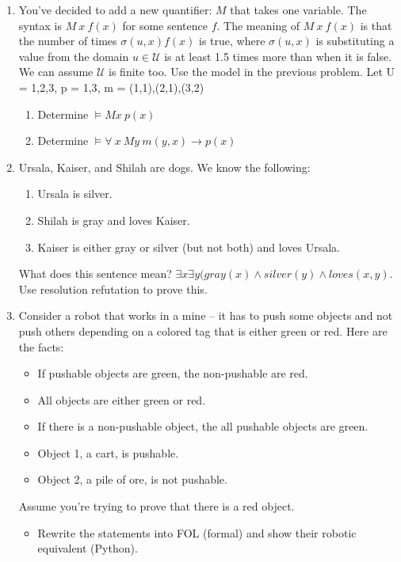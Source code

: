 \documentclass{article}
\begin{document}
\begin{enumerate}
\begin{enumerate}
\end{enumerate}
\item You've decided to add a new quantifier: $M$ that takes one variable.  The syntax is $M\ x\ f(x)$ for some sentence $f$.  The meaning of $M\ x\ f(x)$ is that the number of times $\sigma(u,x) f(x)$ is true, where $\sigma(u,x)$ is substituting a value from the domain $u \in \mathcal{U}$ is at least 1.5 times more than when it is false.  We can assume $\mathcal{U}$ is finite too.  Use the model in the previous problem.
\newline Let U = {1,2,3}, p = {1,3}, m = {(1,1),(2,1),(3,2)}
\begin{enumerate}
\item Determine $\models M x\ p(x)$
\item Determine $\models \forall \ x\ M y \ m(y,x) \rightarrow p(x)$
\end{enumerate}
\item Ursala, Kaiser, and Shilah are dogs.  We know the following:
\begin{enumerate}
\item Ursala is silver.
\item Shilah is gray and loves Kaiser.
\item Kaiser is either gray or silver (but not both) and loves Ursala.
\end{enumerate}
What does this sentence mean? $\exists x \exists y (gray(x) \wedge silver(y) \wedge loves(x,y)$.  Use resolution refutation to prove this.
\item Consider a robot that works in a mine -- it has to push some objects and not push others depending on a colored tag that is either green or red.  Here are the facts:
\begin{itemize}
\item If pushable objects are green, the non-pushable are red.
\item All objects are either green or red.
\item If there is a non-pushable object, the all pushable objects are green.
\item Object 1, a cart, is pushable.
\item Object 2, a pile of ore, is not pushable. 
\end{itemize}
Assume you're trying to prove that there is a red object. 
\begin{itemize}
\item Rewrite the statements into FOL (formal) and show their robotic equivalent (Python). \begin{itemize}

\end{itemize}
\end{itemize}
\end{enumerate}
\end{document}
